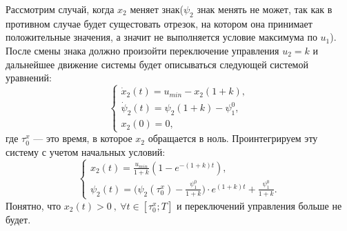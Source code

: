 \documentclass[10pt]{article}
\begin{document}
	Рассмотрим случай, когда \( x_2 \) меняет знак(\( \psi_2 \) знак менять не может, так как в противном случае будет сущестовать отрезок, на котором она принимает положительные значения, а значит не выполняется условие максимума по \( u_1 \)). После смены знака должно произойти переключение управления \( u_2 = k\) и дальнейшее движение системы будет описываться следующей системой уравнений:
	\begin{equation}\label{syst_11}
		\begin{cases}
			\dot{x}_2(t) = u_{min} - x_2(1 + k),
			\\
			\dot{\psi}_2(t) = \psi_2(1 + k) - \psi_1^0,
			\\
			x_2(0) = 0,
		\end{cases}
	\end{equation}
	где \( \tau_0^x \) --- это время, в которое \( x_2 \) обращается в ноль. Проинтегрируем эту систему с учетом начальных условий:
	\begin{equation} \label{syst_12}
		\begin{cases}
			x_2(t) = \frac{u_{min}}{1+k}(1 - e^{-(1+k)t}),
			\\
			\psi_2(t) = \big( \psi_2(\tau_0^x) - \frac{\psi_1^0}{1 + k} \big) \cdot e^{(1+k)t} + \frac{\psi_1^0}{1+k}.
		\end{cases}
	\end{equation} 
	Понятно, что \( x_2(t) > 0 \ , \ \forall t \in [\tau_0^x; T] \) и переключений управления больше не будет. 
	
\end{document}
